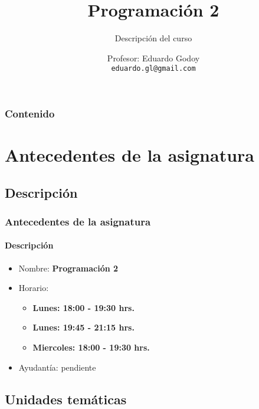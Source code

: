 \documentclass{beamer}
\title[\textbf{Programaci\'on 2}]{\textbf{Programaci\'on 2}}
\subtitle{Descripci\'on del curso}
\author[Eduardo Godoy]
{
	Profesor: Eduardo Godoy \\ 
	\vspace{0.5mm}
	\texttt{\small eduardo.gl@gmail.com}
}
\institute[Universidad de Valpara\'iso]
\begin{document}
	\begin{frame}
		\titlepage
	\end{frame}

	\begin{frame}
		\frametitle{Contenido}
		\tableofcontents%
	\end{frame}

	\section{Antecedentes de la asignatura}

		\subsection{Descripci\'on}

		\begin{frame}
			\frametitle{Antecedentes de la asignatura}
			\framesubtitle{Descripci\'on}

			\begin{itemize}
				\item Nombre: \textbf{Programaci\'on 2}
				\item Horario: 
				\begin{itemize}
					\item \textbf{Lunes: 18:00 - 19:30 hrs.}
					\item \textbf{Lunes: 19:45 - 21:15 hrs.}
					\item \textbf{Miercoles: 18:00 - 19:30 hrs.}
				\end{itemize}
				\item Ayudant\'ia: pendiente
			\end{itemize}
		\end{frame}

		\subsection{Unidades tem\'aticas}
\end{document}
